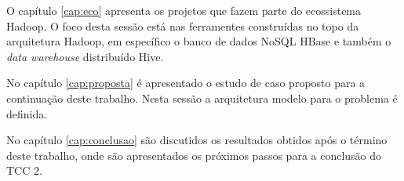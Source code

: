 O capítulo \ref{cap:eco} apresenta os projetos que fazem parte do ecossistema Hadoop. O foco desta sessão está nas ferramentes construídas no topo da arquitetura Hadoop, em específico o banco de dados NoSQL HBase e também o \textit{data warehouse} distribuído Hive.

No capítulo \ref{cap:proposta} é apresentado o estudo de caso proposto para a continuação deste trabalho. Nesta sessão a arquitetura modelo para o problema é definida.

No capítulo \ref{cap:conclusao} são discutidos os resultados obtidos após o término deste trabalho, onde são apresentados os próximos passos para a conclusão do TCC 2.

